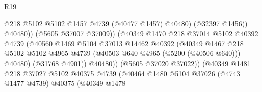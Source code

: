 \begin{lexlean}{R19}
\begin{coremodule}
{{{{{{{{{{{                                                  @218
                                                  @5102
                                                  @5102
                                                  @1457
                                                  @4739
                                                  (@40477 @1457)
                                                  @40480)
                                                (@32397 @1456))
                                              @40480))
                                          (@5605 @37007 @37009))
                                        (@40349
                                          @1470
                                          @218
                                          @37014
                                          @5102
                                          @40392
                                          @4739
                                          (@40560
                                            @1469
                                            @5104
                                            @37013
                                            @14462
                                            @40392
                                            (@40349
                                              @1467
                                              @218
                                              @5102
                                              @5102
                                              @4965
                                              @4739
                                              (@40503 @640 @4965 (@5200 (@40506 @640)))
                                              @40480)
                                            (@31768 @4901))
                                          @40480))
                                      (@5605 @37020 @37022))
                                    (@40349
                                      @1481
                                      @218
                                      @37027
                                      @5102
                                      @40375
                                      @4739
                                      (@40464
                                        @1480
                                        @5104
                                        @37026
                                        (@4743 @1477 @4739)
                                        @40375
                                        (@40349
                                          @1478
}}}}}}}}}}}
\end{coremodule}
\end{lexlean}
